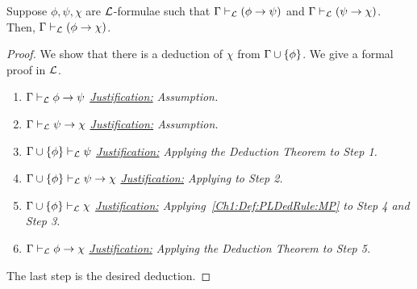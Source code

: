 \begin{boxcorollary}
    Suppose $\phi, \psi, \chi$ are $\mathcal{L}$-formulae such that $\Gamma \vdash_{\mathcal{L}} \left( \phi \to \psi \right)$ and $\Gamma \vdash_{\mathcal{L}} \left( \psi \to \chi \right)$. Then, $\Gamma \vdash_{\mathcal{L}} \left( \phi \to \chi \right)$.
\end{boxcorollary}
\begin{proof}
    We show that there is a deduction of $\chi$ from $\Gamma \cup \left\{ \phi \right\}$. We give a formal proof in $\mathcal{L}$.

    \begin{enumerate}
        \item $\Gamma \vdash_{\mathcal{L}} \phi \to \psi$
        \newline
        \textit{\underline{Justification:}
            Assumption.
        }

        \item $\Gamma \vdash_{\mathcal{L}} \psi \to \chi$
        \newline
        \textit{\underline{Justification:}
            Assumption.
        }

        \item $\Gamma \cup \left\{ \phi \right\} \vdash_{\mathcal{L}} \psi$
        \newline
        \textit{\underline{Justification:}
            Applying the Deduction Theorem to Step 1.
        }

        \item $\Gamma \cup \left\{ \phi \right\} \vdash_{\mathcal{L}} \psi \to \chi$
        \newline
        \textit{\underline{Justification:}
            Applying  to Step 2.
        }

        \item $\Gamma \cup \left\{ \phi \right\} \vdash_{\mathcal{L}} \chi$
        \newline
        \textit{\underline{Justification:}
            Applying~\ref{Ch1:Def:PLDedRule:MP} to Step 4 and Step 3.
        }

        \item $\Gamma \vdash_{\mathcal{L}} \phi \to \chi$
        \newline
        \textit{\underline{Justification:}
            Applying the Deduction Theorem to Step 5.
        }
    \end{enumerate}
    The last step is the desired deduction.
\end{proof}

